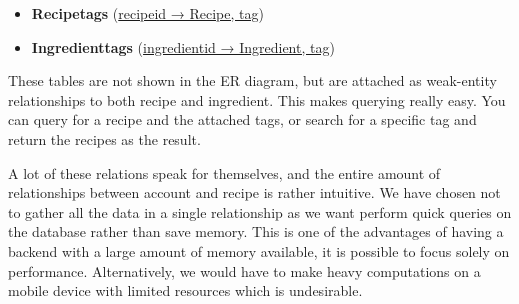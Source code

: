 \begin{itemize}
\item \textbf{Recipetags} (\underline{recipeid → Recipe, tag})

\item \textbf{Ingredienttags} (\underline{ingredientid → Ingredient, tag}) 
\end{itemize}

These tables are not shown in the ER diagram, but are attached as weak-entity relationships to both recipe and ingredient. This makes querying really easy. You can query for a recipe and the attached tags, or search for a specific tag and return the recipes as the result.

A lot of these relations speak for themselves, and the entire amount of relationships between account and recipe is rather intuitive. We have chosen not to gather all the data in a single relationship as we want perform quick queries on the database rather than save memory. This is one of the advantages of having a backend with a large amount of memory available, it is possible to focus solely on performance. Alternatively, we would have to make heavy computations on a mobile device with limited resources which is undesirable.